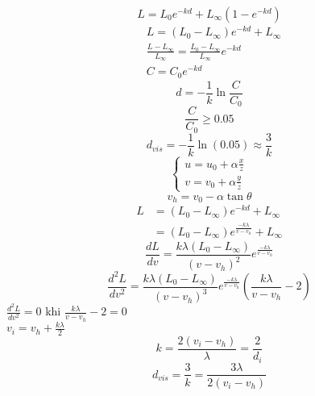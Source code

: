 \documentclass[conference]{IEEEtran}
\begin{document}
	\begin{equation*}
	L = L_0e^{-kd} + L_{\infty}(1 - e^{-kd})
	\end{equation*}
	\begin{align*}
	&L = (L_0 - L_\infty)e^{-kd} + L_\infty\\
	&\frac{L - L_\infty}{L_\infty} = \frac{L_0 - L_\infty}{L_\infty}e^{-kd}\\
	&C = C_0e^{-kd}
	\end{align*}
	\begin{equation*}
	d = -\frac{1}{k}\ln{\frac{C}{C_0}}
	\end{equation*}
	\begin{equation*}
	\frac{C}{C_0} \ge 0.05
	\end{equation*}
	\begin{equation*}
	d_{vis} = -\frac{1}{k}\ln{(0.05)} \approx \frac{3}{k}
	\end{equation*}
	\[
	\begin{cases*}	
	 u = u_0 + \alpha\frac{x}{z}\\
	 v = v_0 + \alpha\frac{y}{z} 
	 \end{cases*}
	\]
	\begin{equation*}
	v_h = v_0 - \alpha\tan{\theta}
	\end{equation*}
	\begin{align*}
	L &= (L_0 - L_\infty)e^{-kd} + L_\infty\\
	  &= (L_0 - L_\infty)e^{\frac{-k\lambda}{v - v_h}} + L_\infty
	\end{align*}
	\begin{equation*}
	\frac{dL}{dv} = \frac{k\lambda(L_0 - L_\infty)}{(v - v_h)^2}e^{\frac{-k\lambda}{v - v_h}}
	\end{equation*}
	\begin{equation*}
	\frac{d^2L}{dv^2} = \frac{k\lambda(L_0 - L_\infty)}{(v - v_h)^3}e^{\frac{-k\lambda}{v - v_h}}(\frac{k\lambda}{v - v_h} - 2)
	\end{equation*}
	$\frac{d^2L}{dv^2} = 0$ khi $\frac{k\lambda}{v - v_h} - 2 = 0$\\
	\newline
	$v_i = v_h + \frac{k\lambda}{2}$
	\begin{equation*}
	k = \frac{2(v_i - v_h)}{\lambda} = \frac{2}{d_i} 
	\end{equation*}
	\begin{equation*}
	d_{vis} = \frac{3}{k} = \frac{3\lambda}{2(v_i - v_h)}
	\end{equation*}
\end{document}
